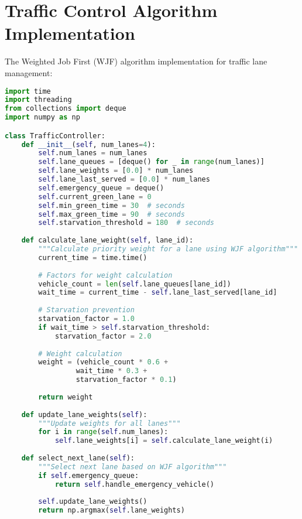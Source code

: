 \section{Traffic Control Algorithm Implementation}
\label{app:traffic_control}

The Weighted Job First (WJF) algorithm implementation for traffic lane management:

\begin{lstlisting}[language=Python, caption=WJF Traffic Control Algorithm]
import time
import threading
from collections import deque
import numpy as np

class TrafficController:
    def __init__(self, num_lanes=4):
        self.num_lanes = num_lanes
        self.lane_queues = [deque() for _ in range(num_lanes)]
        self.lane_weights = [0.0] * num_lanes
        self.lane_last_served = [0.0] * num_lanes
        self.emergency_queue = deque()
        self.current_green_lane = 0
        self.min_green_time = 30  # seconds
        self.max_green_time = 90  # seconds
        self.starvation_threshold = 180  # seconds
        
    def calculate_lane_weight(self, lane_id):
        """Calculate priority weight for a lane using WJF algorithm"""
        current_time = time.time()
        
        # Factors for weight calculation
        vehicle_count = len(self.lane_queues[lane_id])
        wait_time = current_time - self.lane_last_served[lane_id]
        
        # Starvation prevention
        starvation_factor = 1.0
        if wait_time > self.starvation_threshold:
            starvation_factor = 2.0
        
        # Weight calculation
        weight = (vehicle_count * 0.6 + 
                 wait_time * 0.3 + 
                 starvation_factor * 0.1)
        
        return weight
    
    def update_lane_weights(self):
        """Update weights for all lanes"""
        for i in range(self.num_lanes):
            self.lane_weights[i] = self.calculate_lane_weight(i)
    
    def select_next_lane(self):
        """Select next lane based on WJF algorithm"""
        if self.emergency_queue:
            return self.handle_emergency_vehicle()
        
        self.update_lane_weights()
        return np.argmax(self.lane_weights)
    

\end{lstlisting}
